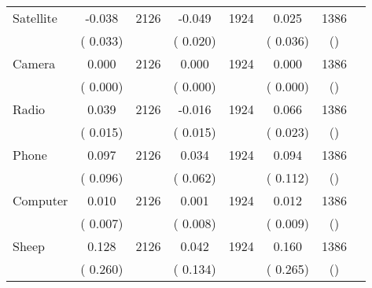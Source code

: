 \begin{tabular}{l*{6}{c}}
Satellite        &             -0.038      &       2126       &             -0.049      &       1924       &              0.025      &       1386  &  &              \\
                       &       (       0.033)            &                               &       (       0.020)            &                               &       (       0.036)            &       () &                  \\
Camera        &              0.000      &       2126       &              0.000      &       1924       &              0.000      &       1386  &  &              \\
                       &       (       0.000)            &                               &       (       0.000)            &                               &       (       0.000)            &       () &                  \\
Radio        &              0.039      &       2126       &             -0.016      &       1924       &              0.066      &       1386  &  &              \\
                       &       (       0.015)            &                               &       (       0.015)            &                               &       (       0.023)            &       () &                  \\
Phone        &              0.097      &       2126       &              0.034      &       1924       &              0.094      &       1386  &  &              \\
                       &       (       0.096)            &                               &       (       0.062)            &                               &       (       0.112)            &       () &                  \\
Computer        &              0.010      &       2126       &              0.001      &       1924       &              0.012      &       1386  &  &              \\
                       &       (       0.007)            &                               &       (       0.008)            &                               &       (       0.009)            &       () &                  \\
Sheep        &              0.128      &       2126       &              0.042      &       1924       &              0.160      &       1386  &  &              \\
                       &       (       0.260)            &                               &       (       0.134)            &                               &       (       0.265)            &       () &                  \\

\end{tabular}
